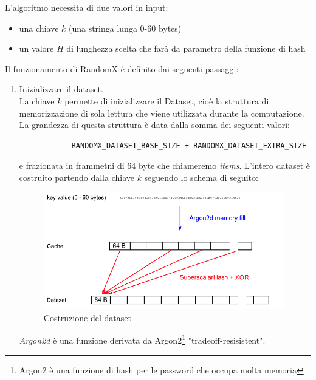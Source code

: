 \documentclass[12pt,a4paper]{article}
\begin{document}
L'algoritmo necessita di due valori in input:

\begin{itemize}
    \item una chiave $k$ (una stringa lunga 0-60 bytes)
    \item un valore $H$ di lunghezza scelta che farà da parametro della funzione
    di hash
\end{itemize}

Il funzionamento di RandomX è definito dai seguenti passaggi:

\begin{enumerate}
    \item Inizializzare il dataset.\\
        La chiave $k$ permette di inizializzare il Dataset, cioè la struttura di
        memorizzazione di sola lettura che viene utilizzata durante la
        computazione. La grandezza di questa struttura è data dalla somma dei
        seguenti valori:

        \begin{verbatim}
            RANDOMX_DATASET_BASE_SIZE + RANDOMX_DATASET_EXTRA_SIZE
        \end{verbatim}

        e frazionata in frammetni di 64 byte che chiameremo \textit{items}.
        L'intero dataset è costruito partendo dalla chiave $k$ seguendo lo
        schema di seguito:

        \begin{figure}[ht]
            \centering
            \includegraphics[width=0.99\textwidth]{./images/dataset_construction.png}
            \caption{Costruzione del dataset}
            \label{fig:data_construction}
        \end{figure}

        \textit{Argon2d} è una funzione derivata da Argon2\footnote{Argon2 è una
        funzione di hash per le password che occupa molta memoria}
        "tradeoff-resisistent".


\end{enumerate}
\end{document}
